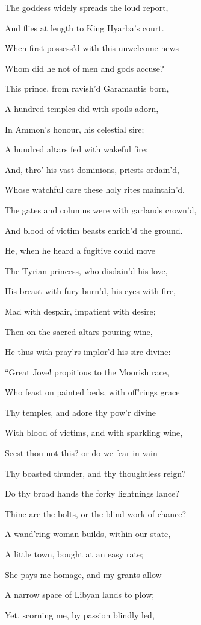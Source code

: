 The goddess widely spreads the loud report,

And flies at length to King Hyarba’s court.

When first possess’d with this unwelcome news

Whom did he not of men and gods accuse?

This prince, from ravish’d Garamantis born,

A hundred temples did with spoils adorn,

In Ammon’s honour, his celestial sire;

A hundred altars fed with wakeful fire;

And, thro’ his vast dominions, priests ordain’d,

Whose watchful care these holy rites maintain’d.

The gates and columns were with garlands crown’d,

And blood of victim beasts enrich’d the ground.

He, when he heard a fugitive could move

The Tyrian princess, who disdain’d his love,

His breast with fury burn’d, his eyes with fire,

Mad with despair, impatient with desire;

Then on the sacred altars pouring wine,

He thus with pray’rs implor’d his sire divine:

“Great Jove! propitious to the Moorish race,

Who feast on painted beds, with off’rings grace

Thy temples, and adore thy pow’r divine

With blood of victims, and with sparkling wine,

Seest thou not this? or do we fear in vain

Thy boasted thunder, and thy thoughtless reign?

Do thy broad hands the forky lightnings lance?

Thine are the bolts, or the blind work of chance?

A wand’ring woman builds, within our state,

A little town, bought at an easy rate;

She pays me homage, and my grants allow

A narrow space of Libyan lands to plow;

Yet, scorning me, by passion blindly led,

